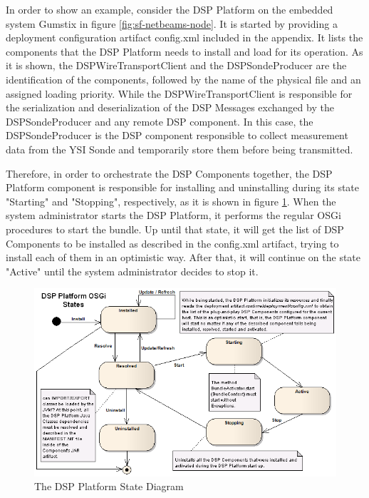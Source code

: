 In order to show an example, consider the DSP Platform on the embedded system
Gumstix in figure \ref{fig:sf-netbeams-node}. It is started by providing a
deployment configuration artifact config.xml included in the appendix. It lists
the components that the DSP Platform needs to install and load for its
operation. As it is shown, the DSPWireTransportClient and the DSPSondeProducer
are the identification of the components, followed by the name of the physical
file and an assigned loading priority. While the DSPWireTransportClient is
responsible for the serialization and deserialization of the DSP Messages
exchanged by the DSPSondeProducer and any remote DSP component. In this case,
the DSPSondeProducer is the DSP component responsible to collect measurement
data from the YSI Sonde and temporarily store them before being transmitted.

Therefore, in order to orchestrate the DSP Components together, the DSP
Platform component is responsible for installing and uninstalling during its
state "Starting" and "Stopping", respectively, as it is shown in figure
\ref{fig:DSPPlatform-Install-Usage-State-Diagram}. When the system
administrator starts the DSP Platform, it performs the regular OSGi procedures
to start the bundle. Up until that state, it will get the list of DSP
Components to be installed as described in the config.xml artifact, trying to
install each of them in an optimistic way. After that, it will continue on the
state "Active" until the system administrator decides to stop it.

\begin{figure}[!b]
  \centering
  \includegraphics[scale=0.6]{../diagrams/DSPPlatform-Install-Usage-State-Diagram}
  \caption{The DSP Platform State Diagram}
  \label{fig:DSPPlatform-Install-Usage-State-Diagram}
\end{figure}

